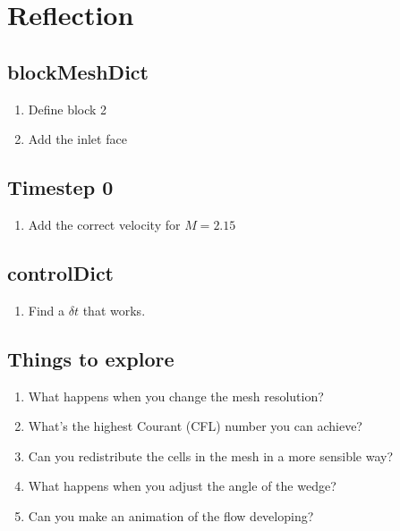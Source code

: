 \documentclass{article}
\begin{document}
\section{Reflection}

\subsection{blockMeshDict}
\begin{enumerate}
\item Define block 2
\item Add the inlet face
\end{enumerate}

\subsection{Timestep 0}
\begin{enumerate}
\item Add the correct velocity for $M=2.15$
\end{enumerate}

\subsection{controlDict}
\begin{enumerate}
\item Find a $\delta t$ that works.
\end{enumerate}

\subsection{Things to explore}
\begin{enumerate}
\item What happens when you change the mesh resolution?
\item What's the highest Courant (CFL) number you can achieve?
\item Can you redistribute the cells in the mesh in a more sensible way?
\item What happens when you adjust the angle of the wedge?
\item Can you make an animation of the flow developing?
\end{enumerate}
\end{document}
